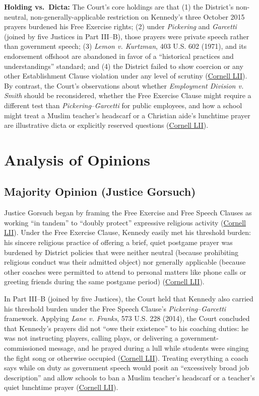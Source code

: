 \documentclass[12pt]{article}
\begin{document}
\textbf{Holding vs.\ Dicta:} The Court's core holdings are that (1) the District's non-neutral, non-generally-applicable restriction on Kennedy's three October 2015 prayers burdened his Free Exercise rights; (2) under \textit{Pickering} and \textit{Garcetti} (joined by five Justices in Part III--B), those prayers were private speech rather than government speech; (3) \textit{Lemon v. Kurtzman}, 403 U.S. 602 (1971), and its endorsement offshoot are abandoned in favor of a ``historical practices and understandings'' standard; and (4) the District failed to show coercion or any other Establishment Clause violation under any level of scrutiny (\href{https://www.law.cornell.edu/supremecourt/text/21-418}{Cornell LII}). By contrast, the Court's observations about whether \textit{Employment Division v. Smith} should be reconsidered, whether the Free Exercise Clause might require a different test than \textit{Pickering}--\textit{Garcetti} for public employees, and how a school might treat a Muslim teacher's headscarf or a Christian aide's lunchtime prayer are illustrative dicta or explicitly reserved questions (\href{https://www.law.cornell.edu/supremecourt/text/21-418}{Cornell LII}).

\section{Analysis of Opinions}

\subsection{Majority Opinion (Justice Gorsuch)}
Justice Gorsuch began by framing the Free Exercise and Free Speech Clauses as working ``in tandem'' to ``doubly protect'' expressive religious activity (\href{https://www.law.cornell.edu/supremecourt/text/21-418}{Cornell LII}). Under the Free Exercise Clause, Kennedy easily met his threshold burden: his sincere religious practice of offering a brief, quiet postgame prayer was burdened by District policies that were neither neutral (because prohibiting religious conduct was their admitted object) nor generally applicable (because other coaches were permitted to attend to personal matters like phone calls or greeting friends during the same postgame period) (\href{https://www.law.cornell.edu/supremecourt/text/21-418}{Cornell LII}).

In Part III--B (joined by five Justices), the Court held that Kennedy also carried his threshold burden under the Free Speech Clause's \textit{Pickering}--\textit{Garcetti} framework. Applying \textit{Lane v. Franks}, 573 U.S. 228 (2014), the Court concluded that Kennedy's prayers did not ``owe their existence'' to his coaching duties: he was not instructing players, calling plays, or delivering a government-commissioned message, and he prayed during a lull while students were singing the fight song or otherwise occupied (\href{https://www.law.cornell.edu/supremecourt/text/21-418}{Cornell LII}). Treating everything a coach says while on duty as government speech would posit an ``excessively broad job description'' and allow schools to ban a Muslim teacher's headscarf or a teacher's quiet lunchtime prayer (\href{https://www.law.cornell.edu/supremecourt/text/21-418}{Cornell LII}).
\end{document}
